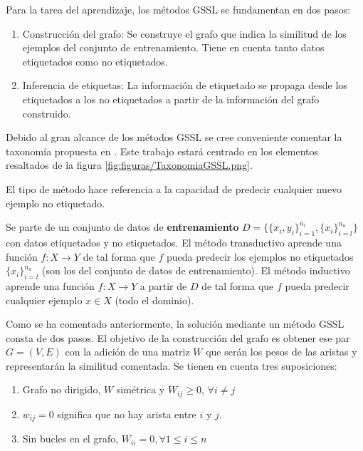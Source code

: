 Para la tarea del aprendizaje, los métodos GSSL se fundamentan en dos pasos:

\begin{enumerate}
    \item Construcción del grafo: Se construye el grafo que indica la similitud de los ejemplos del conjunto de entrenamiento. Tiene en cuenta tanto datos etiquetados como no etiquetados.
    \item Inferencia de etiquetas: La información de etiquetado se propaga desde los etiquetados a los no etiquetados a partir de la información del grafo construido.
\end{enumerate}

Debido al gran alcance de los métodos GSSL se cree conveniente comentar la taxonomía propuesta en \cite{song2022graph}. Este trabajo estará centrado en los elementos resaltados de la figura \ref{fig:figuras/TaxonomiaGSSL.png}.


El tipo de método hace referencia a la capacidad de predecir cualquier nuevo ejemplo no etiquetado.

Se parte de un conjunto de datos de \textbf{entrenamiento} $D = \{\{x_i,y_i\}^{n_l}_{i=1}, \{x_i\}^{n_u}_{i=l}\}$ con datos etiquetados y no etiquetados. 
El método transductivo aprende una función $f : X \rightarrow Y$ de tal forma que $f$ pueda predecir los ejemplos no etiquetados $\{x_i\}^{n_u}_{i=l}$ (son los del conjunto de datos de entrenamiento).
El método inductivo aprende una función $f : X \rightarrow Y$ a partir de $D$ de tal forma que $f$ pueda predecir cualquier ejemplo $x \in X$ (todo el dominio).

Como se ha comentado anteriormente, la solución mediante un método GSSL consta de dos pasos. El objetivo de la construcción del grafo es obtener ese par $G = (V,E)$ con la adición de una matriz $W$ que serán los pesos de las aristas y representarán la similitud comentada. Se tienen en cuenta tres suposiciones:
\begin{enumerate}
    \item Grafo no dirigido, $W$ simétrica y $W_{ij} \geq 0$,  $\forall i \neq j$
    \item $w_{ij} = 0$ significa que no hay arista entre $i$ y $j$.
    \item Sin bucles en el grafo, $W_{ii} = 0, \forall 1 \leq i \leq n$
\end{enumerate}

